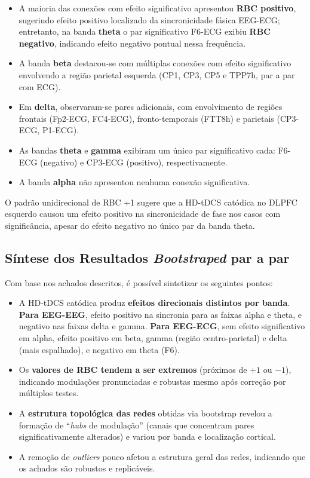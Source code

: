 \begin{itemize}
  \item A maioria das conexões com efeito significativo apresentou \textbf{RBC positivo}, sugerindo efeito positivo localizado da sincronicidade fásica EEG-ECG; entretanto, na banda \textbf{theta} o par significativo F6-ECG exibiu \textbf{RBC negativo}, indicando efeito negativo pontual nessa frequência.
  \item A banda \textbf{beta} destacou-se com múltiplas conexões com efeito significativo envolvendo a região parietal esquerda (CP1, CP3, CP5 e TPP7h, par a par com ECG).
  \item Em \textbf{delta}, observaram-se pares adicionais, com envolvimento de regiões frontais (Fp2-ECG, FC4-ECG), fronto-temporais (FTT8h) e parietais (CP3-ECG, P1-ECG).
  \item As bandas \textbf{theta} e \textbf{gamma} exibiram um único par significativo cada: F6-ECG (negativo) e CP3-ECG (positivo), respectivamente.
  \item A banda \textbf{alpha} não apresentou nenhuma conexão significativa.
\end{itemize}

O padrão unidirecional de RBC +1 sugere que a HD-tDCS catódica no DLPFC esquerdo causou um efeito positivo na sincronicidade de fase nos casos com significância, apesar do efeito negativo no único par da banda theta.

\subsection{Síntese dos Resultados \textit{Bootstraped} par a par}

Com base nos achados descritos, é possível sintetizar os seguintes pontos:

\begin{itemize}
  \item A HD-tDCS catódica produz \textbf{efeitos direcionais distintos por banda}. \textbf{Para EEG-EEG}, efeito positivo na sincronia para as faixas alpha e theta, e negativo nas faixas delta e gamma. \textbf{Para EEG-ECG}, sem efeito significativo em alpha, efeito positivo em beta, gamma (região centro-parietal) e delta (mais espalhado), e negativo em theta (F6).
  \item Os \textbf{valores de RBC tendem a ser extremos} (próximos de $+1$ ou $-1$), indicando modulações pronunciadas e robustas mesmo após correção por múltiplos testes.
  \item A \textbf{estrutura topológica das redes} obtidas via bootstrap revelou a formação de ``\textit{hubs} de modulação'' (canais que concentram pares significativamente alterados) e variou por banda e localização cortical.
  \item A remoção de \textit{outliers} pouco afetou a estrutura geral das redes, indicando que os achados são robustos e replicáveis.
\end{itemize}

